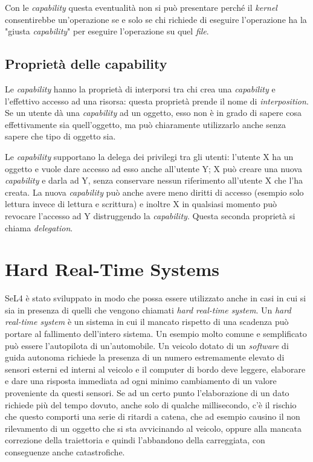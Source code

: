 Con le \textit{capability} questa eventualità non si può presentare perché il \textit{kernel} consentirebbe un'operazione se e solo se chi richiede di eseguire l'operazione ha la "giusta \textit{capability}" per eseguire l'operazione su quel \textit{file}. 

\subsection{Proprietà delle capability}
Le \textit{capability} hanno la proprietà di interporsi tra chi crea una \textit{capability} e l'effettivo accesso ad una risorsa: questa proprietà prende il nome di \textit{interposition}. Se un utente dà una \textit{capability} ad un oggetto, esso non è in grado di sapere cosa effettivamente sia quell'oggetto, ma può chiaramente utilizzarlo anche senza sapere che tipo di oggetto sia.

Le \textit{capability} supportano la delega dei privilegi tra gli utenti: l'utente X ha un oggetto e vuole dare accesso ad esso anche all'utente Y; X può creare una nuova \textit{capability} e darla ad Y, senza conservare nessun riferimento all'utente X che l'ha creata. La nuova \textit{capability} può anche avere meno diritti di accesso (esempio solo lettura invece di lettura e scrittura) e inoltre X in qualsiasi momento può revocare l'accesso ad Y distruggendo la \textit{capability}. Questa seconda proprietà si chiama \textit{delegation}.

\section{Hard Real-Time Systems}
SeL4 è stato sviluppato in modo che possa essere utilizzato anche in casi in cui si sia in presenza di quelli che vengono chiamati \textit{hard real-time system}.
Un \textit{hard real-time system} è un sistema in cui il mancato rispetto di una scadenza può portare al fallimento dell'intero sistema. Un esempio molto comune e semplificato può essere l'autopilota di un'automobile. Un veicolo dotato di un \textit{software} di guida autonoma richiede la presenza di un numero estremamente elevato di sensori esterni ed interni al veicolo e il computer di bordo deve leggere, elaborare e dare una risposta immediata ad ogni minimo cambiamento di un valore proveniente da questi sensori. Se ad un certo punto l'elaborazione di un dato richiede più del tempo dovuto, anche solo di qualche millisecondo, c'è il rischio che questo comporti una serie  di ritardi a catena, che ad esempio causino il non rilevamento di un oggetto che si sta avvicinando al veicolo, oppure alla mancata correzione della traiettoria e quindi l'abbandono della carreggiata, con conseguenze anche catastrofiche.

